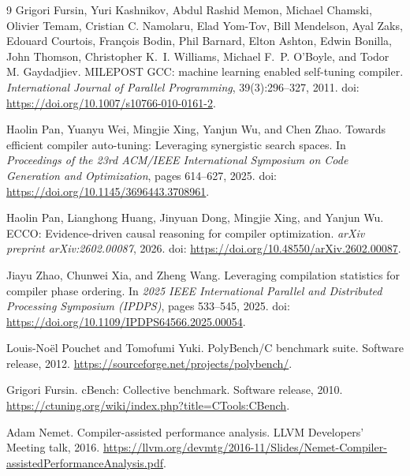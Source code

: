 \documentclass{article}
\begin{document}
\begin{thebibliography}{9}
Grigori Fursin, Yuri Kashnikov, Abdul Rashid Memon, Michael Chamski, Olivier Temam, Cristian C. Namolaru, Elad Yom-Tov, Bill Mendelson, Ayal Zaks, Edouard Courtois, Fran\c{c}ois Bodin, Phil Barnard, Elton Ashton, Edwin Bonilla, John Thomson, Christopher K.~I. Williams, Michael F.~P. O'Boyle, and Todor M. Gaydadjiev.
\newblock MILEPOST {GCC}: machine learning enabled self-tuning compiler.
\newblock \emph{International Journal of Parallel Programming}, 39(3):296--327, 2011.
\newblock doi: \url{https://doi.org/10.1007/s10766-010-0161-2}.

Haolin Pan, Yuanyu Wei, Mingjie Xing, Yanjun Wu, and Chen Zhao.
\newblock Towards efficient compiler auto-tuning: Leveraging synergistic search spaces.
\newblock In \emph{Proceedings of the 23rd ACM/IEEE International Symposium on Code Generation and Optimization}, pages 614--627, 2025.
\newblock doi: \url{https://doi.org/10.1145/3696443.3708961}.

Haolin Pan, Lianghong Huang, Jinyuan Dong, Mingjie Xing, and Yanjun Wu.
\newblock ECCO: Evidence-driven causal reasoning for compiler optimization.
\newblock \emph{arXiv preprint arXiv:2602.00087}, 2026.
\newblock doi: \url{https://doi.org/10.48550/arXiv.2602.00087}.

Jiayu Zhao, Chunwei Xia, and Zheng Wang.
\newblock Leveraging compilation statistics for compiler phase ordering.
\newblock In \emph{2025 IEEE International Parallel and Distributed Processing Symposium (IPDPS)}, pages 533--545, 2025.
\newblock doi: \url{https://doi.org/10.1109/IPDPS64566.2025.00054}.

Louis-No\"el Pouchet and Tomofumi Yuki.
\newblock PolyBench/C benchmark suite.
\newblock Software release, 2012.
\newblock \url{https://sourceforge.net/projects/polybench/}.

Grigori Fursin.
\newblock cBench: Collective benchmark.
\newblock Software release, 2010.
\newblock \url{https://ctuning.org/wiki/index.php?title=CTools:CBench}.

Adam Nemet.
\newblock Compiler-assisted performance analysis.
\newblock LLVM Developers' Meeting talk, 2016.
\newblock \url{https://llvm.org/devmtg/2016-11/Slides/Nemet-Compiler-assistedPerformanceAnalysis.pdf}.


\end{thebibliography}
\end{document}

